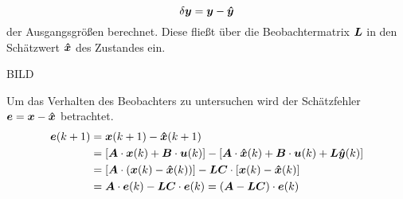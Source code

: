 \begin{equation}
\delta\boldsymbol{y} = \boldsymbol{y} - \boldsymbol{\hat{y}}
\end{equation}
der Ausgangsgrößen berechnet. Diese fließt über die Beobachtermatrix $\boldsymbol{L}$ in den Schätzwert $\boldsymbol{\hat{x}}$ des Zustandes ein.

BILD

Um das Verhalten des Beobachters zu untersuchen wird der Schätzfehler $\boldsymbol{e} = \boldsymbol{x} - \boldsymbol{\hat{x}}$ betrachtet.
\begin{equation}
\begin{split}
\boldsymbol{e}(k+1) &= \boldsymbol{x}(k+1) - \boldsymbol{\hat{x}}(k+1) \\
&= [\boldsymbol{A}\cdot \boldsymbol{x}(k) + \boldsymbol{B}\cdot \boldsymbol{u}(k)] - [\boldsymbol{A}\cdot \boldsymbol{\hat{x}}(k) + \boldsymbol{B}\cdot \boldsymbol{u}(k) +\boldsymbol{L}\boldsymbol{\hat{y}}(k)]
\\
&= [\boldsymbol{A}\cdot (\boldsymbol{x}(k) - \boldsymbol{\hat{x}}(k))] - \boldsymbol{L}\boldsymbol{C}\cdot[\boldsymbol{x}(k)-\boldsymbol{\hat{x}}(k)] 
\\
&= \boldsymbol{A}\cdot \boldsymbol{e}(k) - \boldsymbol{LC}\cdot\boldsymbol{e}(k) = (\boldsymbol{A}-\boldsymbol{LC})\cdot \boldsymbol{e}(k)
\end{split}
\end{equation}